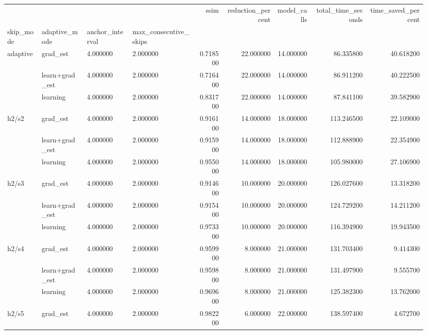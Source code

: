 \begin{tabular}{llllrrrrr}
\toprule
 &  &  &  & ssim & reduction_percent & model_calls & total_time_seconds & time_saved_percent \\
skip_mode & adaptive_mode & anchor_interval & max_consecutive_skips &  &  &  &  &  \\
\midrule
\multirow[t]{3}{*}{adaptive} & grad_est & 4.000000 & 2.000000 & 0.718500 & 22.000000 & 14.000000 & 86.335800 & 40.618200 \\
\cline{2-9} \cline{3-9}
 & learn+grad_est & 4.000000 & 2.000000 & 0.716400 & 22.000000 & 14.000000 & 86.911200 & 40.222500 \\
\cline{2-9} \cline{3-9}
 & learning & 4.000000 & 2.000000 & 0.831700 & 22.000000 & 14.000000 & 87.841100 & 39.582900 \\
\cline{1-9} \cline{2-9} \cline{3-9}
\multirow[t]{3}{*}{h2/s2} & grad_est & 4.000000 & 2.000000 & 0.916100 & 14.000000 & 18.000000 & 113.246500 & 22.109000 \\
\cline{2-9} \cline{3-9}
 & learn+grad_est & 4.000000 & 2.000000 & 0.915900 & 14.000000 & 18.000000 & 112.888900 & 22.354900 \\
\cline{2-9} \cline{3-9}
 & learning & 4.000000 & 2.000000 & 0.955000 & 14.000000 & 18.000000 & 105.980000 & 27.106900 \\
\cline{1-9} \cline{2-9} \cline{3-9}
\multirow[t]{3}{*}{h2/s3} & grad_est & 4.000000 & 2.000000 & 0.914600 & 10.000000 & 20.000000 & 126.027600 & 13.318200 \\
\cline{2-9} \cline{3-9}
 & learn+grad_est & 4.000000 & 2.000000 & 0.915400 & 10.000000 & 20.000000 & 124.729200 & 14.211200 \\
\cline{2-9} \cline{3-9}
 & learning & 4.000000 & 2.000000 & 0.973300 & 10.000000 & 20.000000 & 116.394900 & 19.943500 \\
\cline{1-9} \cline{2-9} \cline{3-9}
\multirow[t]{3}{*}{h2/s4} & grad_est & 4.000000 & 2.000000 & 0.959900 & 8.000000 & 21.000000 & 131.703400 & 9.414300 \\
\cline{2-9} \cline{3-9}
 & learn+grad_est & 4.000000 & 2.000000 & 0.959800 & 8.000000 & 21.000000 & 131.497900 & 9.555700 \\
\cline{2-9} \cline{3-9}
 & learning & 4.000000 & 2.000000 & 0.969600 & 8.000000 & 21.000000 & 125.382300 & 13.762000 \\
\cline{1-9} \cline{2-9} \cline{3-9}
\multirow[t]{3}{*}{h2/s5} & grad_est & 4.000000 & 2.000000 & 0.982200 & 6.000000 & 22.000000 & 138.597400 & 4.672700 \\

\end{tabular}
